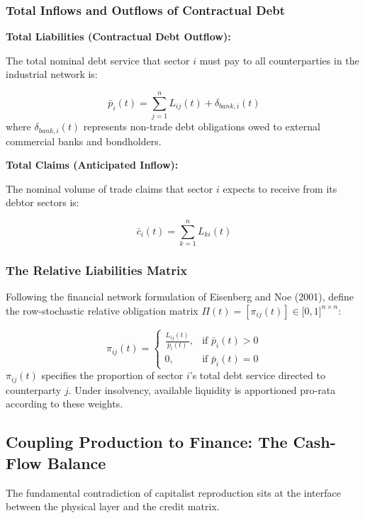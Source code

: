 \documentclass[11pt,letterpaper]{report}
\begin{document}
\subsubsection{Total Inflows and Outflows of Contractual Debt}
\textbf{Total Liabilities (Contractual Debt Outflow):}

The total nominal debt service that sector $i$ must pay to all counterparties in the industrial network is:

\[
{\bar{p}}_{i}(t)=\sum\limits_{j=1}^{n}{L}_{ij}(t)+{\delta }_{bank,i}(t)
\]
where ${\delta }_{bank,i}(t)$ represents non-trade debt obligations owed to external commercial banks and bondholders.

\textbf{Total Claims (Anticipated Inflow):}

The nominal volume of trade claims that sector $i$ expects to receive from its debtor sectors is:

\[
{\bar{c}}_{i}(t)=\sum\limits_{k=1}^{n}{L}_{ki}(t)
\]
\subsubsection{The Relative Liabilities Matrix}
Following the financial network formulation of Eisenberg and Noe (2001), define the row-stochastic relative obligation matrix $\Pi (t)=[{\pi }_{ij}(t)]\in [0,1{]}^{n\times n}$:

\[
\pi_{ij}(t) = \begin{cases} \frac{L_{ij}(t)}{\bar{p}_i(t)}, & \text{if } \bar{p}_i(t) > 0 \\ 0, & \text{if } \bar{p}_i(t) = 0 \end{cases}
\]
${\pi }_{ij}(t)$ specifies the proportion of sector $i$'s total debt service directed to counterparty $j$. Under insolvency, available liquidity is apportioned pro-rata according to these weights.

\subsection{Coupling Production to Finance: The Cash-Flow Balance}
The fundamental contradiction of capitalist reproduction sits at the interface between the physical layer and the credit matrix.
\end{document}
